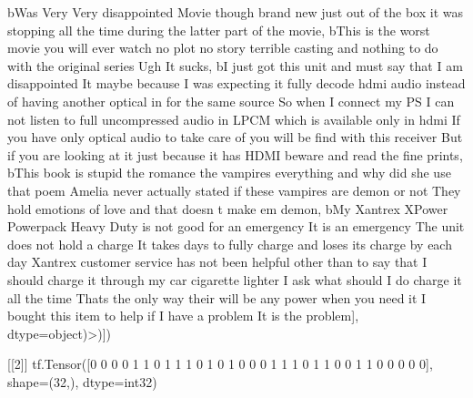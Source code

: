 \documentclass[
]{article}
\newenvironment{Shaded}{}{}
\newcommand{\AttributeTok}[1]{\textcolor[rgb]{0.49,0.56,0.16}{#1}}
\newcommand{\DecValTok}[1]{\textcolor[rgb]{0.25,0.63,0.44}{#1}}
\newcommand{\FunctionTok}[1]{\textcolor[rgb]{0.02,0.16,0.49}{#1}}
\newcommand{\NormalTok}[1]{#1}
\newcommand{\SpecialCharTok}[1]{\textcolor[rgb]{0.25,0.44,0.63}{#1}}
\newcommand{\StringTok}[1]{\textcolor[rgb]{0.25,0.44,0.63}{#1}}
\begin{document}
\begin{Shaded}
\begin{Highlighting}[]
\NormalTok{       b}\StringTok{\textquotesingle{}Was Very Very disappointed Movie though brand new just out of the box it was stopping all the time during the latter part of the movie\textquotesingle{}}\NormalTok{,}
\NormalTok{       b}\StringTok{\textquotesingle{}This is the worst movie you will ever watch no plot no story terrible casting and nothing to do with the original series Ugh It sucks\textquotesingle{}}\NormalTok{,}
\NormalTok{       b}\StringTok{\textquotesingle{}I just got this unit and must say that I am disappointed It maybe because I was expecting it fully decode hdmi audio instead of having another optical in for the same source So when I connect my PS I can not listen to full uncompressed audio in LPCM which is available only in hdmi If you have only optical audio to take care of you will be find with this receiver But if you are looking at it just because it has HDMI beware and read the fine prints\textquotesingle{}}\NormalTok{,}
\NormalTok{       b}\StringTok{\textquotesingle{}This book is stupid the romance the vampires everything and why did she use that poem Amelia never actually stated if these vampires are demon or not They hold emotions of love and that doesn t make em demon\textquotesingle{}}\NormalTok{,}
\NormalTok{       b}\StringTok{\textquotesingle{}My Xantrex XPower Powerpack Heavy Duty is not good for an emergency It is an emergency The unit does not hold a charge It takes days to fully charge and loses its charge by each day Xantrex customer service has not been helpful other than to say that I should charge it through my car cigarette lighter I ask what should I do charge it all the time Thats the only way their will be any power when you need it I bought this item to help if I have a problem It is the problem\textquotesingle{}}\NormalTok{],}
      \AttributeTok{dtype=}\NormalTok{object)}\SpecialCharTok{\textgreater{}}\NormalTok{)])}

\NormalTok{[[}\DecValTok{2}\NormalTok{]]}
\FunctionTok{tf.Tensor}\NormalTok{([}\DecValTok{0} \DecValTok{0} \DecValTok{0} \DecValTok{0} \DecValTok{1} \DecValTok{1} \DecValTok{0} \DecValTok{1} \DecValTok{1} \DecValTok{1} \DecValTok{0} \DecValTok{1} \DecValTok{0} \DecValTok{1} \DecValTok{0} \DecValTok{0} \DecValTok{0} \DecValTok{1} \DecValTok{1} \DecValTok{1} \DecValTok{0} \DecValTok{1} \DecValTok{1} \DecValTok{0} \DecValTok{0} \DecValTok{1} \DecValTok{1} \DecValTok{0} \DecValTok{0} \DecValTok{0} \DecValTok{0} \DecValTok{0}\NormalTok{], }\AttributeTok{shape=}\NormalTok{(}\DecValTok{32}\NormalTok{,), }\AttributeTok{dtype=}\NormalTok{int32)}


\end{Highlighting}
\end{Shaded}
\end{document}
